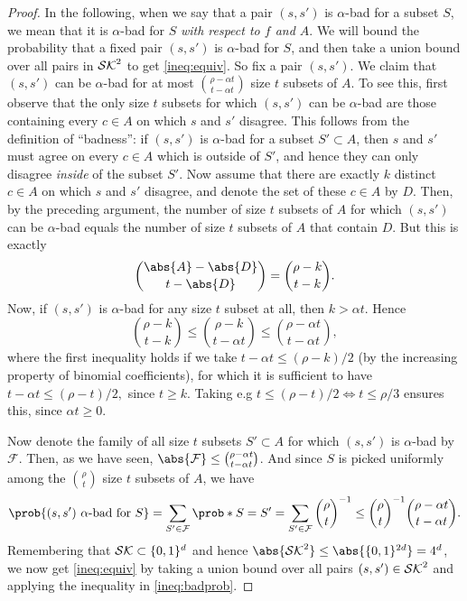 \begin{proof}
  In the following, when we say that a pair \((s,s')\) is \(\alpha\)-bad for a subset \(S\),
  we mean that it is \(\alpha\)-bad for \(S\) \emph{with respect to \(f\) and \(A\)}.
  We will bound the probability that a fixed pair \((s,s')\) is \(\alpha\)-bad for \(S\),
  and then take a union bound over all pairs in \(\mathcal{SK}^{2}\) to get \eqref{ineq:equiv}.
  So fix a pair \((s,s')\).
  We claim that \((s,s')\) can be \(\alpha\)-bad for at most \(\binom{\rho - \alpha t}{t - \alpha t}\) size \(t\) subsets of \(A\).
  To see this, first observe that the only size \(t\) subsets for which \((s, s')\) can be \(\alpha\)-bad
  are those containing every \(c \in A\) on which \(s\) and \(s'\) disagree.
  This follows from the definition of ``badness'':
  if \((s,s')\) is \(\alpha\)-bad for a subset \(S' \subset A\),
  then \(s\) and \(s'\) must agree on every \(c \in A\) which is outside of \(S'\),
  and hence they can only disagree \emph{inside} of the subset \(S'\).
  Now assume that there are exactly \(k\) distinct \(c \in A\) on which \(s\) and \(s'\)
  disagree, and denote the set of these \(c \in A\) by \(D\).
  Then, by the preceding argument, the number of size \(t\) subsets of \(A\) for which \((s, s')\)
  can be \(\alpha\)-bad equals the number of size \(t\) subsets of \(A\) that contain \(D\).
  But this is exactly
  \[
    \binom{\abs{A} - \abs{D}}{t - \abs{D}} = \binom{\rho - k}{t - k}.
  \]
  Now, if \((s, s')\) is \(\alpha\)-bad for any size \(t\) subset at all, then \(k > \alpha t\). Hence
  \[
    \binom{\rho - k}{t - k} \le \binom{\rho - k}{t - \alpha t} \le \binom{\rho - \alpha t}{t - \alpha t},
  \]
  where the first inequality holds if we take
  \(
    t - \alpha t \le (\rho - k)/2
  \)
  (by the increasing property of binomial coefficients),
  for which it is sufficient to have
  \(
    t - \alpha t \le (\rho - t)/2,
  \)
  since \(t \ge k\).
  Taking e.g \(t \le (\rho - t)/2 \iff t \le \rho / 3\) ensures this,
  since \(\alpha t \ge 0\).

  Now denote the family of all size \(t\) subsets \(S' \subset A\) for which \((s,s')\) is \(\alpha\)-bad by \(\mathcal{F}\).
  Then, as we have seen, \(\abs{\mathcal{F}} \le \binom{\rho - \alpha t}{t - \alpha t}\).
  And since \(S\) is picked uniformly among the \(\binom{\rho}{t}\) size \(t\) subsets
  of \(A\), we have
  \begin{equation}\label{ineq:badprob}
    \prob{(s,s') \text{ \(\alpha\)-bad for } S}
    = \sum_{S' \in \mathcal{F}}{\prob*{S = S'}}
    = \sum_{S' \in \mathcal{F}}{{\binom{\rho}{t}}^{-1}}
    \le {\binom{\rho}{t}}^{-1} \binom{\rho - \alpha t}{t - \alpha t}.
  \end{equation}
  Remembering that \(\mathcal{SK} \subset \{0,1\}^{d}\) and hence
  \(\abs{\setSK^{2}} \le \abs{\{0,1\}^{2d}} = 4^{d}\),
  we now get \eqref{ineq:equiv} by taking a union bound over all pairs \((s,s') \in \mathcal{SK}^{2}\)
  and applying the inequality in \eqref{ineq:badprob}.
\end{proof}

